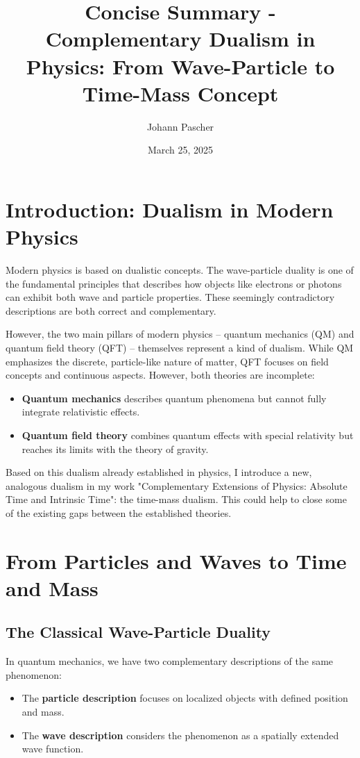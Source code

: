 \documentclass[a4paper,12pt]{article}
\title{Concise Summary - Complementary Dualism in Physics: From Wave-Particle to Time-Mass Concept}
\author{Johann Pascher}
\date{March 25, 2025}
\begin{document}
	\maketitle
	
	\section{Introduction: Dualism in Modern Physics}
	
	Modern physics is based on dualistic concepts.  The wave-particle duality is one of the fundamental principles that describes how objects like electrons or photons can exhibit both wave and particle properties. These seemingly contradictory descriptions are both correct and complementary.
	
	However, the two main pillars of modern physics -- quantum mechanics (QM) and quantum field theory (QFT) -- themselves represent a kind of dualism. While QM emphasizes the discrete, particle-like nature of matter, QFT focuses on field concepts and continuous aspects.  However, both theories are incomplete:
	
	\begin{itemize}
		\item \textbf{Quantum mechanics} describes quantum phenomena but cannot fully integrate relativistic effects.
		\item \textbf{Quantum field theory} combines quantum effects with special relativity but reaches its limits with the theory of gravity.
	\end{itemize}
	
	Based on this dualism already established in physics, I introduce a new, analogous dualism in my work "Complementary Extensions of Physics: Absolute Time and Intrinsic Time": the time-mass dualism. This could help to close some of the existing gaps between the established theories.
	
	\section{From Particles and Waves to Time and Mass}
	
	\subsection{The Classical Wave-Particle Duality}
	
	In quantum mechanics, we have two complementary descriptions of the same phenomenon:
	
	\begin{itemize}
		\item The \textbf{particle description} focuses on localized objects with defined position and mass.
		\item The \textbf{wave description} considers the phenomenon as a spatially extended wave function.
	\end{itemize}
	
\end{document}
